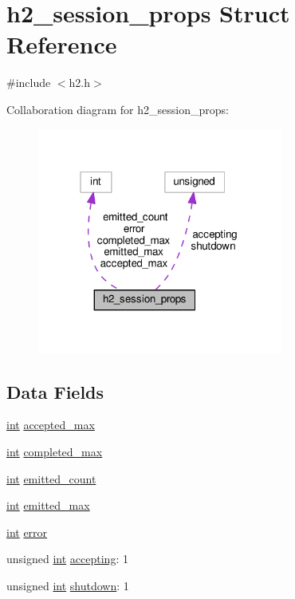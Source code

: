 \hypertarget{structh2__session__props}{}\section{h2\+\_\+session\+\_\+props Struct Reference}
\label{structh2__session__props}


{\ttfamily \#include $<$h2.\+h$>$}



Collaboration diagram for h2\+\_\+session\+\_\+props\+:
\nopagebreak
\begin{figure}[H]
\begin{center}
\leavevmode
\includegraphics[width=229pt]{structh2__session__props__coll__graph}
\end{center}
\end{figure}
\subsection*{Data Fields}
\begin{DoxyCompactItemize}
\item 
\hyperlink{pcre_8txt_a42dfa4ff673c82d8efe7144098fbc198}{int} \hyperlink{structh2__session__props_ae69a7175e0472c5525af0b29881d1667}{accepted\+\_\+max}
\item 
\hyperlink{pcre_8txt_a42dfa4ff673c82d8efe7144098fbc198}{int} \hyperlink{structh2__session__props_aa57e5484c3a1995ab4210b36bb5cdd35}{completed\+\_\+max}
\item 
\hyperlink{pcre_8txt_a42dfa4ff673c82d8efe7144098fbc198}{int} \hyperlink{structh2__session__props_ae41fe68312a954de095d51f8dfe822d0}{emitted\+\_\+count}
\item 
\hyperlink{pcre_8txt_a42dfa4ff673c82d8efe7144098fbc198}{int} \hyperlink{structh2__session__props_a6e5057c1b5f9fa9968e3a6ee3cf517a7}{emitted\+\_\+max}
\item 
\hyperlink{pcre_8txt_a42dfa4ff673c82d8efe7144098fbc198}{int} \hyperlink{structh2__session__props_a4a6f1636628be8452a28906c9a01153f}{error}
\item 
unsigned \hyperlink{pcre_8txt_a42dfa4ff673c82d8efe7144098fbc198}{int} \hyperlink{structh2__session__props_a22f923106761ebfd0e35a62d8882adfa}{accepting}\+: 1
\item 
unsigned \hyperlink{pcre_8txt_a42dfa4ff673c82d8efe7144098fbc198}{int} \hyperlink{structh2__session__props_a14a0cc8252ddce4163ab21728177d060}{shutdown}\+: 1
\end{DoxyCompactItemize}


